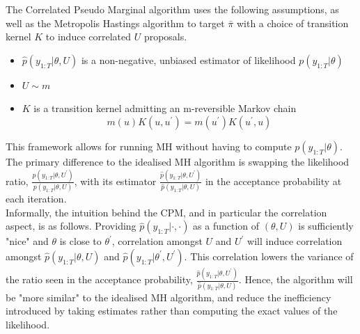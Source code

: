 \documentclass{article}
\begin{document}
The Correlated Pseudo Marginal algorithm uses the following assumptions, as well as the Metropolis Hastings algorithm to target $\bar{\pi}$ with a choice of transition kernel $K$ to induce correlated $U$ proposals.
\begin{itemize}
 \item $\hat{p}(y_{1:T}| \theta, U)$ is a non-negative, unbiased estimator of likelihood $p(y_{1:T}| \theta)$
 \item $U \sim m$
 \item $K$ is a transition kernel admitting an m-reversible Markov chain $$ m(u)K(u,u^\prime) = m(u^\prime)K(u^\prime, u)$$
\end{itemize}


This framework allows for running MH without having to compute $p(y_{1:T}| \theta)$. The primary difference to the idealised MH algorithm is swapping the likelihood ratio, $\frac{ p(y_{1:T}| \theta, U^\prime)}{ p(y_{1:T}| \theta, U)}$, with its estimator $\frac{ \hat{p}(y_{1:T}| \theta, U^\prime)}{ \hat{p}(y_{1:T}| \theta, U)}$ in the acceptance probability at each iteration. \\

Informally, the intuition behind the CPM, and in particular the correlation aspect, is as follows. Providing $\hat{p}(y_{1:T}| \cdot, \cdot)$ as a function of $(\theta, U)$ is sufficiently "nice" and $\theta$ is close to $\theta^\prime$, correlation amongst $U$ and $U^\prime$ will induce correlation amongst $\hat{p}(y_{1:T}| \theta, U)$ and $\hat{p}(y_{1:T}| \theta^\prime, U^\prime)$. This correlation lowers the variance of the ratio seen in the acceptance probability, $\frac{ \hat{p}(y_{1:T}| \theta, U^\prime)}{ \hat{p}(y_{1:T}| \theta, U)}$. Hence, the algorithm will be "more similar" to the idealised MH algorithm, and reduce the inefficiency introduced by taking estimates rather than computing the exact values of the likelihood.
\end{document}

